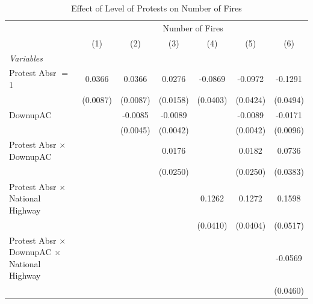 
\begin{table}[htbp]
   \caption{\label{tab:protest_treat_main} Effect of Level of Protests on Number of Fires}
   \centering
   \begin{tabular}{lcccccc}
      \tabularnewline \midrule \midrule
       & \multicolumn{6}{c}{Number of Fires}\\
                                                                 & (1)           & (2)           & (3)           & (4)           & (5)           & (6)\\  
      \midrule
      \emph{Variables}\\
      Protest Absr $=$ 1                                         & 0.0366        & 0.0366        & 0.0276        & -0.0869       & -0.0972       & -0.1291\\   
                                                                 & (0.0087)      & (0.0087)      & (0.0158)      & (0.0403)      & (0.0424)      & (0.0494)\\   
      DownupAC                                                   &               & -0.0085       & -0.0089       &               & -0.0089       & -0.0171\\   
                                                                 &               & (0.0045)      & (0.0042)      &               & (0.0042)      & (0.0096)\\   
      Protest Absr $\times$ DownupAC                             &               &               & 0.0176        &               & 0.0182        & 0.0736\\   
                                                                 &               &               & (0.0250)      &               & (0.0250)      & (0.0383)\\   
      Protest Absr $\times$ National Highway                     &               &               &               & 0.1262        & 0.1272        & 0.1598\\   
                                                                 &               &               &               & (0.0410)      & (0.0404)      & (0.0517)\\   
      Protest Absr $\times$ DownupAC $\times$ National Highway   &               &               &               &               &               & -0.0569\\   
                                                                 &               &               &               &               &               & (0.0460)\\   

\end{tabular}
\end{table}
